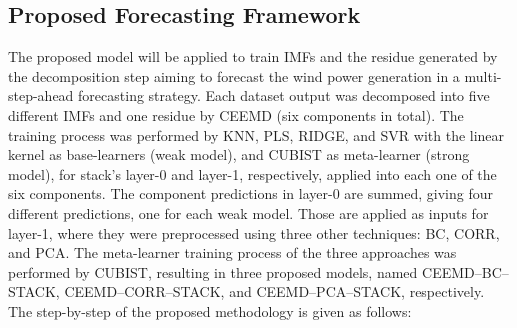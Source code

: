\subsection{Proposed Forecasting Framework}

The proposed model will be applied to train \ac{IMF}s and the residue generated by the decomposition step aiming to forecast the wind power generation in a multi-step-ahead forecasting strategy. Each dataset output was decomposed into five different \ac{IMF}s and one residue by \ac{CEEMD} (six components in total). The training process was performed by \ac{KNN}, \ac{PLS}, \ac{RIDGE}, and \ac{SVR} with the linear kernel as base-learners (weak model), and \ac{CUBIST} as meta-learner (strong model), for stack's layer-0 and layer-1, respectively, applied into each one of the six components. The component predictions in layer-0 are summed, giving four different predictions, one for each weak model. Those are applied as inputs for layer-1, where they were preprocessed using three other techniques: \ac{BC}, \ac{CORR}, and \ac{PCA}. The meta-learner training process of the three approaches was performed by \ac{CUBIST}, resulting in three proposed models, named \ac{CEEMD}--\ac{BC}--\ac{STACK}, \ac{CEEMD}--\ac{CORR}--\ac{STACK}, and \ac{CEEMD}--\ac{PCA}--\ac{STACK}, respectively. The step-by-step of the proposed methodology is given as follows:

